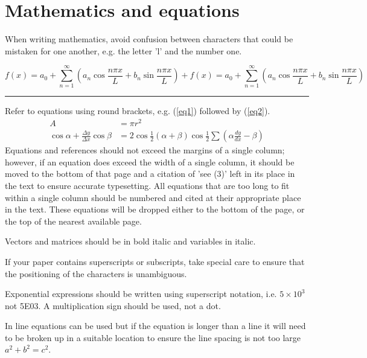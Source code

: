 \documentclass{cta-author}
\begin{document}
\section{Mathematics and equations}\label{sec8}

When writing mathematics, avoid confusion between
characters that could be mistaken for one another, e.g. the
letter 'l' and the number one.

\setcounter{equation}{2}

\begin{figure*}[!t]
\begin{equation}
f(x)  = a_0 + \sum_{n=1}^\infty
\left( {a_n \cos \frac{n\pi x}{L}+b_n \sin \frac{n\pi
x}{L}} \right)+f(x) =a_0 +\sum_{n=1}^\infty \left({a_n \cos \frac{n\pi x}{L}+b_n
\sin \frac{n\pi x}{L}} \right) \label{eq3}
\end{equation}
\noindent\rule{\textwidth}{.5pt}%
\end{figure*}

\setcounter{equation}{0}

Refer to equations using round brackets, e.g. (\ref{eq1})
followed by (\ref{eq2}).
\begin{align}
A & = \pi r^2 \label{eq1}\\
\cos \alpha +\frac{\Delta y}{\Delta x}\cos \beta & =2\cos
\frac{1}{2}\left( {\alpha +\beta } \right)\cos \frac{1}{2} \sum
\left({\alpha \frac{dy}{dx}-\beta}\right)\label{eq2}
\end{align}
Equations and references should not exceed the margins of a
single column; however, if an equation does exceed the
width of a single column, it should be moved to the bottom
of that page and a citation of 'see (3)' left in its place
in the text to ensure accurate typesetting. All equations
that are too long to fit within a single column should be
numbered and cited at their appropriate place in the text.
These equations will be dropped either to the bottom of the page,
or the top of the nearest available page.



Vectors and matrices should be in bold italic and variables
in italic.

If your paper contains superscripts or subscripts, take
special care to ensure that the positioning of the
characters is unambiguous.

Exponential expressions should be written using superscript
notation, i.e. $5 \times 10^{3}$ not 5E03. A multiplication
sign should be used, not a dot.

In line equations can be used but if the equation is longer
than a line it will need to be broken up in a suitable
location to ensure the line spacing is not too
large $a^2+b^2=c^2$.
\end{document}
